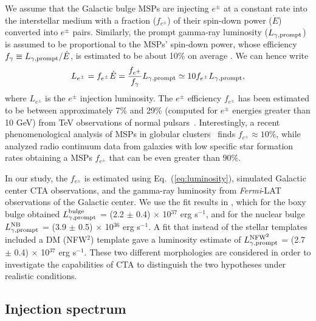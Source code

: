\documentclass[doublespace,nopageskip]{VTthesis} %
\begin{document}
We assume that the Galactic bulge MSPs are injecting $e^{\pm}$ at a constant rate into the interstellar medium with a fraction ($f_{e^{\pm}}$) of their spin-down power ($\dot E$) converted into $e^{\pm}$ pairs. Similarly, the prompt gamma-ray luminosity ($L_{\gamma,{\rm prompt}}$) is assumed to be proportional to the MSPs' spin-down power, whose efficiency $f_\gamma \equiv L_{\gamma,{\rm prompt}}/\dot{E}$, is estimated to be about 10\% on average \citep{2013ApJS..208...17A}. We can hence write 
\begin{equation}\label{eq:luminosity}
  L_{e^\pm}=f_{e^\pm}\dot{E}=\frac{f_{e^\pm}}{f_{\gamma}}  L_{\gamma,{\rm prompt}} \simeq 10f_{e^\pm} L_{\gamma,{\rm prompt}},
\end{equation}
where $L_{e^\pm}$ is the $e^\pm$ injection luminosity. The $e^\pm$ efficiency $f_{e^\pm}$ has been estimated to be between approximately 7\% and 29\% (computed for $e^\pm$ energies greater than 10 GeV) from TeV observations of normal pulsars~\citep{2017PhRvD..96j3013H}.
Interestingly, a recent phenomenological analysis of MSPs in globular clusters~\citep{2021MNRAS.507.5161S} finds $f_{e^\pm}\approx 10\%$, while \citet{2021PhRvD.103h3017S} analyzed radio continuum data from galaxies with low specific star formation rates obtaining a MSPs $f_{e^\pm}$ that can be even greater than $90\%$.



In our study, the $f_{e^\pm}$ is estimated using Eq.~(\ref{eq:luminosity}), simulated Galactic center CTA observations, and the gamma-ray luminosity from \textit{Fermi}-LAT observations of the Galactic center. We use the fit results in \cite{2019JCAP...09..042M}, which for the boxy bulge obtained $L^{\text{bulge}}_{\gamma,{\rm prompt}}$ = (2.2 $\pm$ 0.4) $\times$ 10$^{37}$ erg s$^{-1}$, and for the nuclear bulge $L^{\text{NB}}_{\gamma,{\rm prompt}}$ = (3.9 $\pm$ 0.5) $\times$ 10$^{36}$ erg s$^{-1}$. A fit that instead of the stellar templates included a DM (NFW$^2$) template gave a luminosity estimate of $L^{\text{NFW}^2}_{\gamma,{\rm prompt}}$ = (2.7 $\pm$ 0.4) $\times$ 10$^{37}$ erg s$^{-1}$. These two different morphologies are considered in order to investigate the capabilities of CTA to distinguish the two hypotheses under realistic conditions.

\subsection{Injection spectrum}\label{subsec:spectrum}
\end{document}
